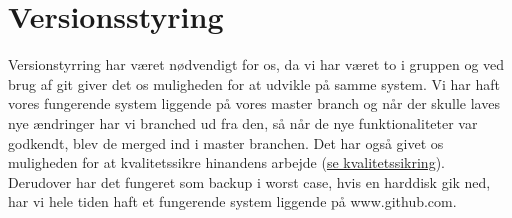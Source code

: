 \section{Versionsstyring}
Versionstyrring har været nødvendigt for os, da vi har været to i gruppen og ved brug af git giver det os
muligheden for at udvikle på samme system. 
Vi har haft vores fungerende system liggende på vores master branch og når der skulle laves nye ændringer har vi branched ud fra den, så når de nye funktionaliteter var godkendt, blev de merged ind i master branchen.
Det har også givet os muligheden for at kvalitetssikre hinandens arbejde (\hyperlink{kvalitetssikring}{se kvalitetssikring}).
Derudover har det fungeret som backup i worst case, hvis en harddisk gik ned, har vi hele tiden haft et fungerende system liggende på www.github.com. 
